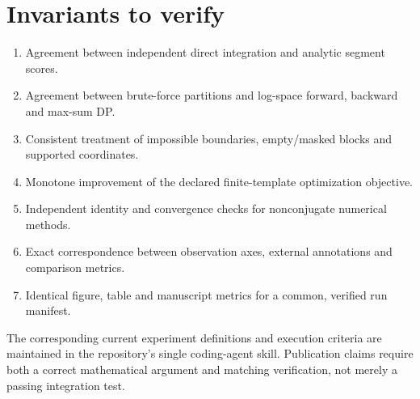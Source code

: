 \section{Invariants to verify}
\begin{enumerate}[leftmargin=1.7em]
\item Agreement between independent direct integration and analytic segment scores.
\item Agreement between brute-force partitions and log-space forward, backward and max-sum DP.
\item Consistent treatment of impossible boundaries, empty/masked blocks and supported coordinates.
\item Monotone improvement of the declared finite-template optimization objective.
\item Independent identity and convergence checks for nonconjugate numerical methods.
\item Exact correspondence between observation axes, external annotations and comparison metrics.
\item Identical figure, table and manuscript metrics for a common, verified run manifest.
\end{enumerate}
The corresponding current experiment definitions and execution criteria are maintained in the
repository's single coding-agent skill. Publication claims require both a correct mathematical
argument and matching verification, not merely a passing integration test.

